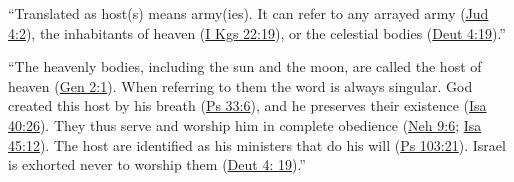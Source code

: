 			\begin{compactdesc}
				\item[TWOT 1865b, 750]	\phantom{.}
					\begin{compactitem}
						\item ``Translated as host(s)  means army(ies). It can refer to any arrayed army (\hyperref[JUDGES-4-2]{Jud 4:2}), the inhabitants of heaven (\hyperref[1KINGS-22-19]{I Kgs 22:19}), or the celestial bodies (\hyperref[DEUTERONOMY-4-19]{Deut 4:19}).''
						\item ``The heavenly bodies, including the sun and the moon, are called the host of heaven (\hyperref[GENESIS-2-1]{Gen 2:1}). When referring to them the word is always singular. God created this host by his breath (\hyperref[PSALMS-33-6]{Ps 33:6}), and he preserves their existence (\hyperref[ISAIAH-40-26]{Isa 40:26}). They thus serve and worship him in complete obedience (\hyperref[NEHEMIAH-9-6]{Neh 9:6}; \hyperref[ISAIAH-45-12]{Isa 45:12}). The host are identified as his ministers that do his will (\hyperref[PSALMS-103-21]{Ps 103:21}). Israel is exhorted never to worship them (\hyperref[DEUTERONOMY-4-19]{Deut 4: 19}).''

\end{compactitem}
\end{compactdesc}
